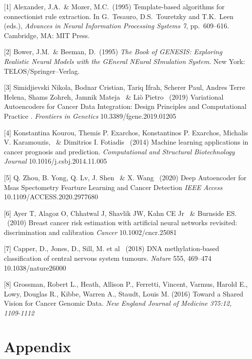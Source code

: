 \documentclass{article}
\begin{document}
{
\small

[1] Alexander, J.A.\ \& Mozer, M.C.\ (1995) Template-based algorithms for
connectionist rule extraction. In G.\ Tesauro, D.S.\ Touretzky and T.K.\ Leen
(eds.), {\it Advances in Neural Information Processing Systems 7},
pp.\ 609--616. Cambridge, MA: MIT Press.

[2] Bower, J.M.\ \& Beeman, D.\ (1995) {\it The Book of GENESIS: Exploring
  Realistic Neural Models with the GEneral NEural SImulation System.}  New York:
TELOS/Springer--Verlag.

[3] Simidjievski Nikola, Bodnar Cristian, Tariq Ifrah, Scherer Paul, Andres Terre Helena, Shams Zohreh, Jamnik Mateja \ \& Liò Pietro \ (2019) Variational Autoencoders for Cancer Data Integration: Design Principles and Computational Practice . {\it Frontiers in Genetics} 10.3389/fgene.2019.01205

[4] Konstantina Kourou, Themis P. Exarchos, Konstantinos P. Exarchos, Michalis V. Karamouzis,  \ \& Dimitrios I. Fotiadis \ (2014) Machine learning applications in cancer prognosis and prediction. {\it Computational and Structural Biotechnology Journal} 10.1016/j.csbj.2014.11.005

[5] Q. Zhou, B. Yong, Q. Lv, J. Shen \ \& X. Wang \ (2020) Deep Autoencoder for Msas Spectometry Fearture Learning and Cancer Detection {\it IEEE Access} 10.1109/ACCESS.2020.2977680

[6] Ayer T, Alagoz O, Chhatwal J, Shavlik JW, Kahn CE Jr \ \& Burnside ES. \ (2010) Breast cancer risk estimation with artificial neural networks revisited: discrimination and calibration {\it Cancer} 10.1002/cncr.25081

[7] Capper, D., Jones, D., Sill, M. et al \ (2018) DNA methylation-based classification of central nervous system tumours. {\it Nature} 555, 469–474 10.1038/nature26000

[8] Grossman, Robert L., Heath, Allison P., Ferretti, Vincent, Varmus, Harold E., Lowy, Douglas R., Kibbe, Warren A., Staudt, Louis M. (2016) Toward a Shared Vision for Cancer Genomic Data. \it{New England Journal of Medicine} 375:12, 1109-1112
}





\newpage 

\appendix

\section{Appendix}
\end{document}
